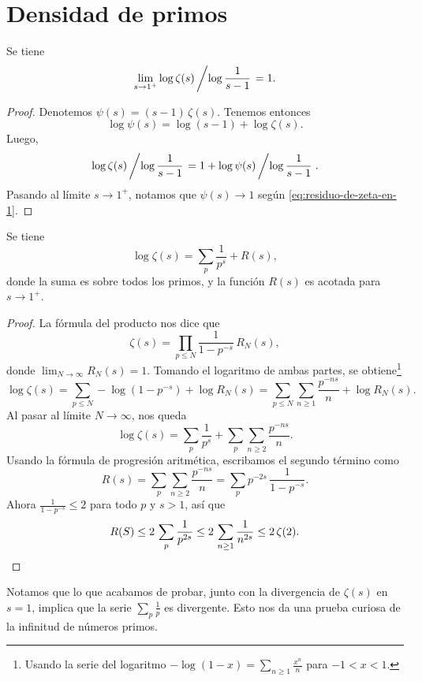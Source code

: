 
\section{Densidad de primos}

\begin{lema}
  \label{lema:log-zeta-log-sm1}
  Se tiene
  $$\lim_{s\to 1^+} \log \zeta (s)\left/\log \frac{1}{s-1}\right. = 1.$$

  \begin{proof}
    Denotemos $\psi (s) = (s-1)\,\zeta (s)$. Tenemos entonces
    $$\log \psi (s) = \log (s-1) + \log \zeta (s).$$
    Luego,
    \[ \log \zeta (s)\left/\log \frac{1}{s-1}\right. =
       1 + \log \psi (s)\left/\log \frac{1}{s-1}\right.. \]
    Pasando al límite $s \to 1^+$, notamos que $\psi (s) \to 1$
    según \eqref{eq:residuo-de-zeta-en-1}.
  \end{proof}
\end{lema}

\begin{lema}
  \label{lema:log-zeta}
  Se tiene
  $$\log \zeta (s) = \sum_p \frac{1}{p^s} + R (s),$$
  donde la suma es sobre todos los primos, y la función $R (s)$ es acotada para
  $s \to 1^+$.

  \begin{proof}
    La fórmula del producto nos dice que
    $$\zeta (s) = \prod_{p \le N} \frac{1}{1 - p^{-s}}\,R_N (s),$$
    donde $\lim_{N\to\infty} R_N (s) = 1$. Tomando el logaritmo de ambas partes,
    se obtiene\footnote{Usando la serie del logaritmo
      $-\log (1-x) = \sum_{n\ge 1} \frac{x^n}{n}$ para $-1 < x < 1$.}
    \[ \log \zeta (s) = \sum_{p \le N} -\log (1 - p^{-s}) + \log R_N (s) =
    \sum_{p\le N} \sum_{n\ge 1} \frac{p^{-ns}}{n} + \log R_N (s). \]
    Al pasar al límite $N \to \infty$, nos queda
    \[ \log \zeta (s) =
       \sum_p \frac{1}{p^s} + \sum_p \sum_{n \ge 2} \frac{p^{-ns}}{n}. \]
    Usando la fórmula de progresión aritmética, escribamos el segundo
    término como
    $$R (s) = \sum_p \sum_{n \ge 2} \frac{p^{-ns}}{n} = \sum_p p^{-2s}\,\frac{1}{1 - p^{-s}}.$$
    Ahora $\frac{1}{1 - p^{-s}} \le 2$ para todo $p$ y $s > 1$, así que
    \[ R (S) \le 2\,\sum_p \frac{1}{p^{2s}} \le 2\,\sum_{n\ge 1} \frac{1}{n^{2s}} \le 2\,\zeta (2). \qedhere \]
  \end{proof}
\end{lema}

Notamos que lo que acabamos de probar, junto con la divergencia de $\zeta (s)$
en $s=1$, implica que la serie $\sum_p \frac{1}{p}$ es divergente. Esto nos da
una prueba curiosa de la infinitud de números primos.

